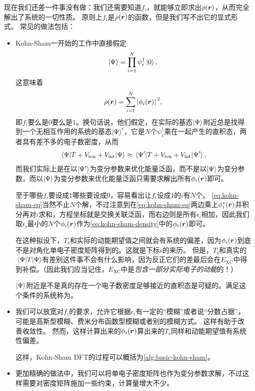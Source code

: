 现在我们还差一件事没有做：我们还需要知道$f_i$，就能够立即求出$\rho(\vb*{r})$，从而完全解出了系统的一切性质。
原则上$f_i$是$\rho(\vb*{r})$的函数，但是我们写不出它的显式形式。
常见的做法包括：
\begin{itemize}
    \item Kohn-Sham一开始的工作中直接假定
    \begin{equation}
        \ket{\Psi} = \prod_{i=1}^N \psi^\dagger_i \ket{0},
        \label{eq:v-representable-wavefunction}
    \end{equation}
    这意味着
    \begin{equation}
        \rho(\vb*{r}) = \sum_{i=1}^N \abs*{\phi_i(\vb*{r})}^2,
    \end{equation}
    即$f_i$要么是$0$要么是$1$。换句话说，他们假定，在实际的基态$\ket{\Psi}$附近总是找得到一个无相互作用的系统的基态$\ket{\Psi}'$，它是$N$个$\psi^\dagger_i$乘在一起产生的直积态，两者具有差不多的电子数密度，从而
    \[
        \mel{\Psi}{T + V_\text{ion} + V_\text{int}}{\Psi} \approx \mel{\Psi'}{T + V_\text{ion} + V_\text{int}}{\Psi'},
    \]
    而我们实际上是在以$\ket{\Psi'}$为变分参数来优化能量泛函，而不是以$\ket{\Psi}$为变分参数，而以$\ket{\Psi}$为变分参数来优化能量泛函只需要求解出所有$\phi_i(\vb*{r})$即可。
    
    至于哪些$f_i$要设成1哪些要设成0，容易看出让$f_i$设成1的$i$有$N$个。
    \eqref{eq:kohn-sham-eq}当然不止$N$个解，不过注意到在\eqref{eq:kohn-sham-eq}两边乘上$\phi_i^*(\vb*{r})$并积分再对$i$求和，方程坐标就是交换关联泛函，而右边则是所有$\epsilon_i$相加，因此我们取$\epsilon_i$最小的$N$个$\phi_i(\vb*{r})$作为\eqref{eq:kohn-sham-density}中的$\phi_i(\vb*{r})$即可。

    在这种拟设下，$T_\text{s}$和实际的动能期望值之间就会有系统的偏差，因为$\phi_i(\vb*{r})$到底不是对角化单电子密度矩阵得到的。这就是下标s的来历。
    但是，$T_\text{s}$和真实的$\mel*{\Psi}{T}{\Psi}$有差别这件事不会有什么影响，因为反正它们的差最后会在$E_\text{XC}$中得到补偿。（因此我们应当记住，$E_\text{XC}$中是\emph{包含一部分实际电子的动能}的！）

    $\ket{\Psi}$附近是不是真的存在一个电子数密度足够接近的直积态是可疑的。满足这个条件的系统称为。
    \item 我们可以放宽对$f_i$的要求，允许它根据$\epsilon_i$有一定的“模糊”或者说“分数占据”，可能是高斯型模糊、费米分布函数型模糊或者别的模糊方式。
    这样有助于改善收敛性。
    然而，这样计算出来的$\phi_i(\vb*{r})$算出来的$T_\text{s}$同样和动能期望值有系统性偏差。

    这样，Kohn-Sham DFT的过程可以概括为\autoref{alg:basic-kohn-sham}。
    \item 更加精确的做法中，我们可以将单电子密度矩阵也作为变分参数求解，不过这样需要对密度矩阵施加一些约束，计算量增大不少。
\end{itemize}

